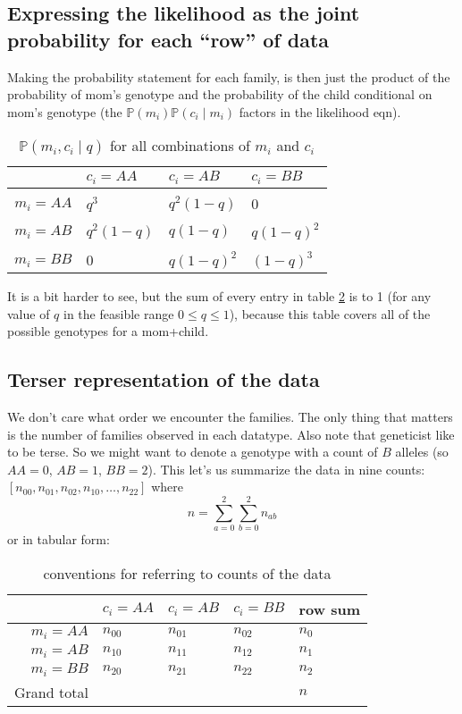 \documentclass[11pt]{article}
\renewcommand{\Pr}{\mathbb{P}}
\begin{document}
\subsection{Expressing the likelihood as the joint probability for each ``row'' of data}
Making the probability statement for each family, is then just the product of the probability
of mom's genotype and the probability of the child conditional on mom's genotype
(the $\Pr\left(m_i\right)\Pr\left(c_i\mid m_i\right)$ factors in the likelihood eqn).

\begin{table}[h!]
\begin{tabular}{r|l|l|l}
& $c_i=AA$ & $c_i=AB$ & $c_i=BB$ \\
\hline
&&&\\
$m_i=AA$ & $q^3$       & $q^2(1-q)$ & $ 0 $\\
& &&\\
$m_i=AB$ & $q^2(1-q)$  & $q(1-q)$   & $q(1-q)^2$\\
& &&\\
$m_i=BB$ & $0$         & $q(1-q)^2$    & $(1-q)^3$\\
\end{tabular}
\caption{$\Pr(m_i, c_i\mid q)$ for all combinations of $m_i$ and $c_i$ }\label{jointProb}
\end{table}

It is a bit harder to see, but the sum of every entry in table \ref{jointProb} is to 1 (for any value of $q$ in the feasible range
$0\leq q\leq 1$), because this table covers all of the possible genotypes for a mom+child.

\subsection{Terser representation of the data}
We don't care what order we encounter the families. 
The only thing that matters is the number of families observed in each datatype.
Also note that geneticist like to be terse. 
So we might want to denote a genotype with a count of $B$ alleles (so $AA=0$, $AB=1$, $BB=2$).
This let's us summarize the data in nine counts: $[n_{00}, n_{01}, n_{02}, n_{10},\ldots,n_{22}]$
where
$$n = \sum_{a=0}^{2}\sum_{b=0}^{2} n_{ab} $$
or in tabular form:
\begin{table}[h!]
\begin{tabular}{r|l|l|l||l}
& $c_i=AA$ & $c_i=AB$ & $c_i=BB$ & row sum\\
\hline
$m_i=AA$ & $n_{00}$       & $n_{01}$ & $n_{02}$ & $n_0$\\
$m_i=AB$ & $n_{10}$       & $n_{11}$ & $n_{12}$ & $n_1$\\
$m_i=BB$ & $n_{20}$       & $n_{21}$ & $n_{22}$ & $n_2$\\
\hline
\hline
Grand total &&& & $n$ 
\end{tabular}
\caption{conventions for referring to counts of the data }\label{jointProb}
\end{table}
\end{document}
